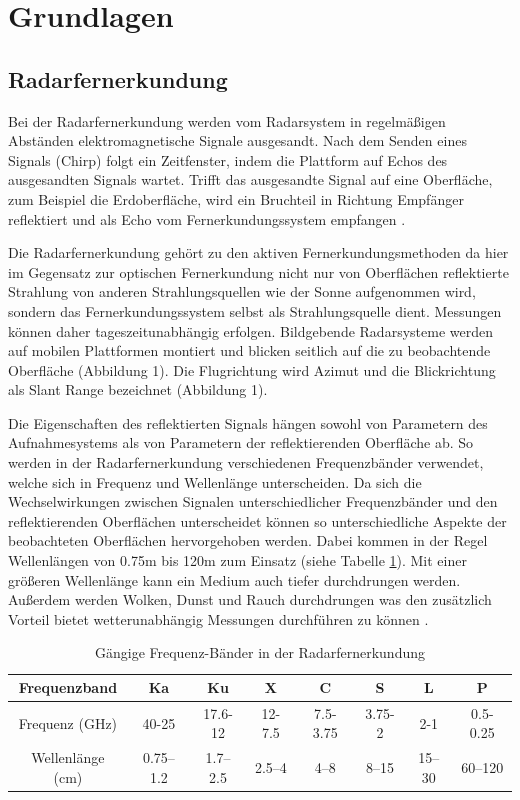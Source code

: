 \newpage
\restoregeometry
\section{Grundlagen}
\subsection{Radarfernerkundung}
Bei der Radarfernerkundung werden vom Radarsystem in regelmäßigen Abständen elektromagnetische Signale ausgesandt. Nach dem Senden eines Signals 
(Chirp) folgt ein Zeitfenster, indem die Plattform auf Echos des ausgesandten Signals wartet.
Trifft das ausgesandte Signal auf eine Oberfläche, zum Beispiel 
die Erdoberfläche, wird ein Bruchteil in Richtung Empfänger reflektiert und als Echo vom Fernerkundungssystem empfangen \cite{tutorial_on_sar}.

Die Radarfernerkundung gehört zu den aktiven Fernerkundungsmethoden da hier im Gegensatz zur optischen Fernerkundung nicht nur 
von Oberflächen reflektierte Strahlung von anderen Strahlungsquellen wie der Sonne aufgenommen wird, sondern das Fernerkundungssystem 
selbst als Strahlungsquelle dient. Messungen können daher tageszeitunabhängig erfolgen. Bildgebende Radarsysteme werden auf mobilen Plattformen 
montiert und blicken seitlich auf die zu beobachtende Oberfläche \cite{tutorial_on_sar} (Abbildung 1). 
Die Flugrichtung wird Azimut und die Blickrichtung als Slant Range bezeichnet \cite{tutorial_on_sar} (Abbildung 1). 

Die Eigenschaften des reflektierten Signals hängen sowohl von Parametern des Aufnahmesystems als von Parametern der reflektierenden Oberfläche ab.
So werden in der Radarfernerkundung verschiedenen Frequenzbänder verwendet, welche sich in Frequenz und Wellenlänge unterscheiden. Da sich die Wechselwirkungen zwischen Signalen 
unterschiedlicher Frequenzbänder und den reflektierenden Oberflächen unterscheidet können so unterschiedliche Aspekte der beobachteten Oberflächen hervorgehoben werden. 
Dabei kommen in der Regel Wellenlängen von 0.75m bis 120m zum Einsatz (siehe Tabelle \ref{frequenzbaender}).
Mit einer größeren Wellenlänge kann ein Medium auch tiefer durchdrungen werden. 
Außerdem werden Wolken, Dunst und Rauch durchdrungen was den zusätzlich Vorteil bietet wetterunabhängig Messungen durchführen zu können \cite{einfuehrung_in_fernerkundung}.

\begin{table}[H]
    \caption{Gängige Frequenz-Bänder in der Radarfernerkundung \cite{tutorial_on_sar}}
    \centering
    \begin{tabular}{c|c c c c c c c } 
        Frequenzband & Ka & Ku & X & C & S & L & P\\ 
        \hline
        Frequenz (GHz) & 40-25 & 17.6-12 & 12-7.5 & 7.5-3.75 & 3.75-2 & 2-1 & 0.5-0.25\\ 
        Wellenlänge (cm) & 0.75–1.2 & 1.7–2.5 & 2.5–4 & 4–8 & 8–15 & 15–30 & 60–120\\ 
    \end{tabular}
    \label{frequenzbaender}
\end{table}

